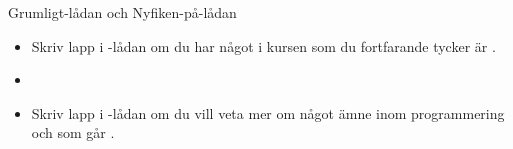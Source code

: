 \begin{Slide}{Grumligt-lådan och Nyfiken-på-lådan}
\begin{itemize}
\item Skriv lapp i -lådan om du har något  i kursen som du fortfarande tycker är .

\item[]

\item Skriv lapp i -lådan om du vill veta mer om något ämne inom programmering och som går .
\end{itemize}
\end{Slide}
